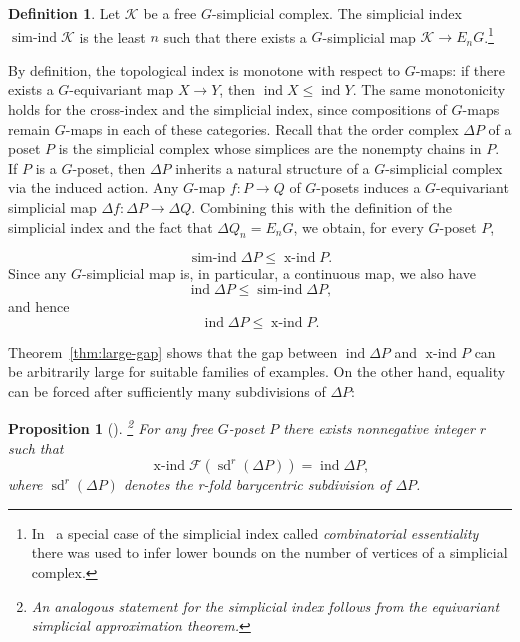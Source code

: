 \documentclass[preprint,12pt]{article}
\renewcommand{\le}{\leqslant}
\newtheorem{proposition}[theorem]{Proposition}
\theoremstyle{definition}
\newtheorem{definition}[theorem]{Definition}
\theoremstyle{remark}
\numberwithin{equation}{section}
\DeclareMathOperator{\ind}{ind}
\DeclareMathOperator{\xind}{x-ind}
\DeclareMathOperator{\sind}{sim-ind}
\DeclareMathOperator{\sd}{sd}
\begin{document}
\begin{definition} 
Let $\mathcal{K}$ be a free $G$-simplicial complex. The simplicial index $\sind \mathcal{K}$ is the least $n$ such that there exists a $G$-simplicial map $\mathcal{K} \to E_n G$.\footnote{In~\cite{avvakumov2021systolic} a special case of the simplicial index called \emph{combinatorial essentiality} there was used to infer lower bounds on the number of vertices of a simplicial complex.}
\end{definition}

By definition, the topological index is monotone with respect to $G$-maps: if there exists a $G$-equivariant map $X \to Y$, then $\ind X \le \ind Y$. The same monotonicity holds for the cross-index and the simplicial index, since compositions of $G$-maps remain $G$-maps in each of these categories. Recall that the order complex $\Delta P$ of a poset $P$ is the simplicial complex whose simplices are the nonempty chains in $P$. If $P$ is a $G$-poset, then $\Delta P$ inherits a natural structure of a $G$-simplicial complex via the induced action. Any $G$-map $f \colon P \to Q$ of $G$-posets induces a $G$-equivariant simplicial map $\Delta f \colon \Delta P \to \Delta Q$. Combining this with the definition of the simplicial index and the fact that $\Delta Q_n= E_n G$, we obtain, for every $G$-poset $P$, 

\begin{equation}\label{eq:index_inequality 1} 
\sind \Delta P \le \xind P.
\end{equation}
Since any $G$-simplicial map is, in particular, a continuous map, we also have 
\begin{equation}\label{eq:index_inequality 2}
\ind \Delta P \le \sind \Delta P,
\end{equation}
and hence 
\begin{equation}\label{eq:index_inequality 3} 
\ind \Delta P \le \xind P. 
\end{equation}

Theorem~\ref{thm:large-gap} shows that the gap between $\ind \Delta P$ and $\xind P$ can be arbitrarily large for suitable families of examples. On the other hand, equality can be forced after sufficiently many subdivisions of $\Delta P$:

\begin{proposition}[{\cite[Proposition 4]{bui2023topological}}]\footnote{An analogous statement for the simplicial index follows from the equivariant simplicial approximation theorem.}
\label{pro:Approximation} 
For any free $G$-poset $P$ there exists nonnegative integer $r$ such that 
$$\xind \mathcal{F}(\sd^r(\Delta P))=\ind \Delta P,$$
where $\sd^r(\Delta P)$ denotes the r-fold barycentric subdivision of $\Delta P$.
\end{proposition}
\end{document}
